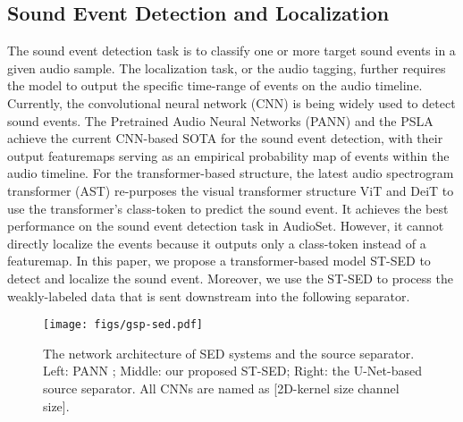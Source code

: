 \documentclass[letterpaper]{article} \usepackage{aaai22}  \usepackage{times}  \usepackage{helvet}  \usepackage{courier}  \usepackage[hyphens]{url}  \usepackage{graphicx} \urlstyle{rm} \def\UrlFont{\rm}  \usepackage{natbib}  \usepackage{caption} \DeclareCaptionStyle{ruled}{labelfont=normalfont,labelsep=colon,strut=off} \frenchspacing  \setlength{\pdfpagewidth}{8.5in}  \setlength{\pdfpageheight}{11in}  \usepackage{algorithm}
\begin{document}
\subsection{Sound Event Detection and Localization}
The sound event detection task is to classify one or more target sound events in a given audio sample. The localization task, or the audio tagging, further requires the model to output the specific time-range of events on the audio timeline. Currently, the convolutional neural network (CNN) \cite{cnn} is being widely used to detect sound events. The Pretrained Audio Neural Networks (PANN) \cite{pann} and the PSLA \cite{psla} achieve the current CNN-based SOTA for the sound event detection, with their output featuremaps serving as an empirical probability map of events within the audio timeline. For the transformer-based structure, the latest audio spectrogram transformer (AST) \cite{ast} re-purposes the visual transformer structure ViT \cite{vit} and DeiT \cite{deit} to use the transformer's class-token to predict the sound event. It achieves the best performance on the sound event detection task in AudioSet. However, it cannot directly localize the events because it outputs only a class-token instead of a featuremap. In this paper, we propose a transformer-based model ST-SED to detect and localize the sound event. Moreover, we use the ST-SED to process the weakly-labeled data that is sent downstream into the following separator. 

\begin{figure*}[t]
    \centering
    \texttt{[image: figs/gsp-sed.pdf]}
    \caption{The network architecture of SED systems and the source separator. Left: PANN \cite{pann}; Middle: our proposed ST-SED; Right: the U-Net-based source separator. All CNNs are named as [2D-kernel size  channel size].}
    \label{fig:gsp-sed}
\vspace{-0.5cm}
\end{figure*}
\end{document}
